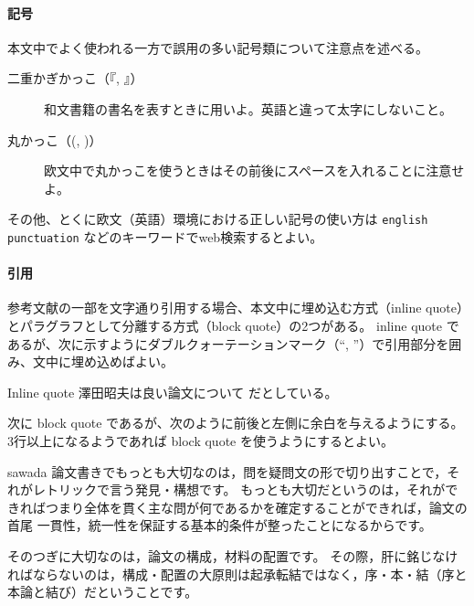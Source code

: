 
	  \paragraph{記号}
			\label{par:symbol}

		  本文中でよく使われる一方で誤用の多い記号類について注意点を述べる。

			\begin{description}
				\item[二重かぎかっこ（『, 』）] 和文書籍の書名を表すときに用いよ。英語と違って太字にしないこと。
				\item[丸かっこ（(, )）] 欧文中で丸かっこを使うときはその前後にスペースを入れることに注意せよ。
			\end{description}

			\noindent
			その他、とくに欧文（英語）環境における正しい記号の使い方は \texttt{english punctuation} などのキーワードでweb検索するとよい。

	  \paragraph{引用}
			\label{par:cite}

			参考文献の一部を文字通り引用する場合、本文中に埋め込む方式（inline quote）とパラグラフとして分離する方式（block quote）の2つがある。
			inline quote であるが、次に示すようにダブルクォーテーションマーク（``, ''）で引用部分を囲み、文中に埋め込めばよい。

			\begin{itembox}[l]{Inline quote}
				澤田昭夫は良い論文について だとしている。
			\end{itembox}

			\noindent
			次に block quote であるが、次のように前後と左側に余白を与えるようにする。
			3行以上になるようであれば block quote を使うようにするとよい。

			\begin{displaycquote}[p. 74]{sawada}
				論文書きでもっとも大切なのは，問を疑問文の形で切り出すことで，それがレトリックで言う発見・構想です。
				もっとも大切だというのは，それができればつまり全体を貫く主な問が何であるかを確定することができれば，論文の首尾 一貫性，統一性を保証する基本的条件が整ったことになるからです。

				そのつぎに大切なのは，論文の構成，材料の配置です。
				その際，肝に銘じなければならないのは，構成・配置の大原則は起承転結ではなく，序・本・結（序と本論と結び）だということです。
			\end{displaycquote}

